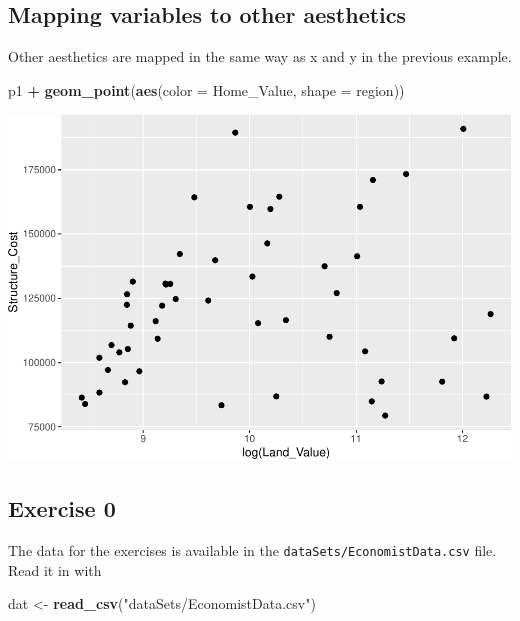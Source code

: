 \documentclass[
]{book}
\newenvironment{Shaded}{\begin{snugshade}}{\end{snugshade}}
\newcommand{\DataTypeTok}[1]{\textcolor[rgb]{0.13,0.29,0.53}{#1}}
\newcommand{\KeywordTok}[1]{\textcolor[rgb]{0.13,0.29,0.53}{\textbf{#1}}}
\newcommand{\NormalTok}[1]{#1}
\newcommand{\OperatorTok}[1]{\textcolor[rgb]{0.81,0.36,0.00}{\textbf{#1}}}
\newcommand{\StringTok}[1]{\textcolor[rgb]{0.31,0.60,0.02}{#1}}
\begin{document}
\hypertarget{mapping-variables-to-other-aesthetics}{%
\subsection{Mapping variables to other aesthetics}\label{mapping-variables-to-other-aesthetics}}

Other aesthetics are mapped in the same way as x and y in the previous example.

\begin{Shaded}
\begin{Highlighting}[]
\NormalTok{p1 }\OperatorTok{+}
\StringTok{  }\KeywordTok{geom\_point}\NormalTok{(}\KeywordTok{aes}\NormalTok{(}\DataTypeTok{color =}\NormalTok{ Home\_Value, }\DataTypeTok{shape =}\NormalTok{ region))}
\end{Highlighting}
\end{Shaded}

\includegraphics{R/Rgraphics/figures/unnamed-chunk-153-1.pdf}

\hypertarget{exercise-0-2}{%
\subsection{Exercise 0}\label{exercise-0-2}}

The data for the exercises is available in the \texttt{dataSets/EconomistData.csv} file. Read it in with

\begin{Shaded}
\begin{Highlighting}[]
\NormalTok{dat \textless{}{-}}\StringTok{ }\KeywordTok{read\_csv}\NormalTok{(}\StringTok{"dataSets/EconomistData.csv"}\NormalTok{)}
\end{Highlighting}
\end{Shaded}
\end{document}

